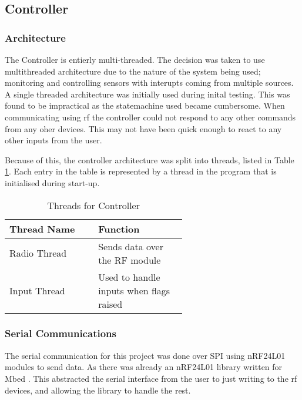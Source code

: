 \documentclass [11pt]{article}
\begin{document}
\subsection{Controller}
\subsubsection{Architecture}


The Controller is entierly multi-threaded. The decision was taken to use  multithreaded architecture due to the nature of the system being used; monitoring and controlling sensors with interupts coming from multiple sources. A single threaded architecture was initially used during inital testing. This was found to be impractical as the statemachine used became cumbersome. When communicating using \gls{rf} the controller could not respond to any other commands from any oher devices. This may not have been quick enough to react to any other inputs from the user. 

Because of this, the controller architecture was split into threads, listed in Table \ref{table:threads_for_controller}. Each entry in the table is represented by a thread in the program that is initialised during start-up. 

\begin{table}[H]
\centering
\setlength{\arrayrulewidth}{1.5pt}
\begin{tabular}{|p{0.3\linewidth}|p{0.3\linewidth}|}
\hline
\cellcolor{gray!40}Thread Name & \cellcolor{gray!40}Function \\ 
\hline
\cellcolor{gray!20}Radio Thread & \cellcolor{gray!20}Sends data over the RF module\\
\hline
\cellcolor{gray!20}Input Thread & \cellcolor{gray!20}Used to handle inputs when flags raised\\
\hline
\end{tabular}
\caption{Threads for Controller}
\label{table:threads_for_controller}
\end{table}

\subsubsection{Serial Communications}\label{sec:serial_communication_1}
The serial communication for this project was done over SPI using nRF24L01 modules to send data. As there was already an nRF24L01 library written for Mbed \cite{nRF24L01_lib_ref}. This abstracted the serial interface from the user to just writing to the \gls{rf} devices, and allowing the library to handle the rest. 
\end{document}
